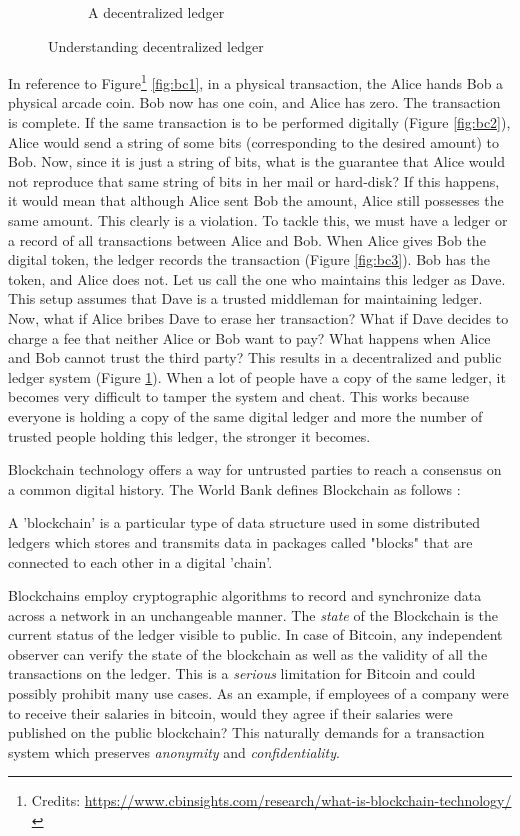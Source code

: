 \begin{figure}[h!]
\begin{subfigure}[b]{0.7\textwidth}
        \caption{A decentralized ledger}
        \label{fig:bc4}
    \end{subfigure}
    \caption{Understanding decentralized ledger}
    \label{fig:bc}
\end{figure}

In reference to Figure\footnote{Credits: \url{https://www.cbinsights.com/research/what-is-blockchain-technology/}}
\ref{fig:bc1}, in a physical transaction, the Alice hands Bob a physical arcade coin. Bob now has one coin, and Alice has zero. The transaction is complete. 
If the same transaction is to be performed digitally (Figure \ref{fig:bc2}), Alice would send a string of some bits (corresponding to the desired amount) to Bob. 
Now, since it is just a string of bits, what is the guarantee that Alice would not reproduce that same string of bits in her mail or hard-disk?
If this happens, it would mean that although Alice sent Bob the amount, Alice still possesses the same amount. 
This clearly is a violation.
To tackle this, we must have a ledger or a record of all transactions between Alice and Bob. 
When Alice gives Bob the digital token, the ledger records the transaction (Figure \ref{fig:bc3}). 
Bob has the token, and Alice does not. Let us call the one who maintains this ledger as Dave.
This setup assumes that Dave is a trusted middleman for maintaining ledger. 
Now, what if Alice bribes Dave to erase her transaction? What if Dave decides to charge a fee that neither Alice or Bob want to pay? 
What happens when Alice and Bob cannot trust the third party? This results in a decentralized and public ledger system (Figure \ref{fig:bc4}). 
When a lot of people have a copy of the same ledger, it becomes very difficult to tamper the system and cheat. 
This works because everyone is holding a copy of the same digital ledger and more the number of trusted people holding this ledger, the stronger it becomes.


Blockchain technology offers a way for untrusted parties to reach a consensus on a common digital history. The World Bank defines Blockchain as follows \cite{natar17}:

\begin{defn}[Blockchain]
    A 'blockchain' is a particular type of data structure used in some distributed ledgers
    which stores and transmits data in packages called "blocks" that are connected to each
    other in a digital 'chain'. 
\end{defn}

Blockchains employ cryptographic algorithms to record and synchronize data across a network in an unchangeable manner. The \textit{state} of the Blockchain is the current status of the ledger visible to public. 
In case of Bitcoin, any independent observer can verify the state of the blockchain as well as the validity of all the transactions on the ledger.
This is a \textit{serious} limitation for Bitcoin and could possibly prohibit many use cases.
As an example, if employees of a company were to receive their salaries in bitcoin, would they agree if their salaries were published on the public blockchain? 
This naturally demands for a transaction system which preserves \textit{anonymity} and \textit{confidentiality}.


